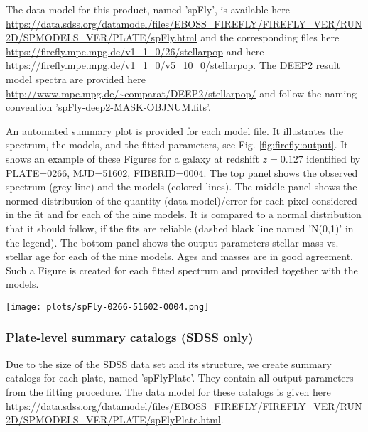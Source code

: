 \documentclass[onecolumn]{aa}
\begin{document}
The data model for this product, named 'spFly', is available here \url{https://data.sdss.org/datamodel/files/EBOSS_FIREFLY/FIREFLY_VER/RUN2D/SPMODELS_VER/PLATE/spFly.html} and the corresponding files here \url{https://firefly.mpe.mpg.de/v1_1_0/26/stellarpop} and here \url{https://firefly.mpe.mpg.de/v1_1_0/v5_10_0/stellarpop}. 
The DEEP2 result model spectra are provided here \url{http://www.mpe.mpg.de/~comparat/DEEP2/stellarpop/} and follow the naming convention 'spFly-deep2-MASK-OBJNUM.fits'.%

An automated summary plot is provided for each model file. 
It illustrates the spectrum, the models, and the fitted parameters, see Fig. \ref{fig:firefly:output}. 
It shows an example of these Figures for a galaxy at redshift $z=0.127$ identified by PLATE=0266, MJD=51602, FIBERID=0004. 
The top panel shows the observed spectrum (grey line) and the models (colored lines). 
The middle panel shows the normed distribution of the quantity (data-model)/error for each pixel considered in the fit and for each of the nine models. 
It is compared to a normal distribution that it should follow, if the fits are reliable (dashed black line named 'N(0,1)' in the legend). 
The bottom panel shows the output parameters stellar mass vs. stellar age for each of the nine models. 
Ages and masses are in good agreement. %
Such a Figure is created for each fitted spectrum and provided together with the models.


\begin{figure*}
\begin{center}
\caption{\label{fig:firefly:output}
Example of a fit taken from the first plate of SDSS considered in this analysis: 0266. 
The top panel shows the observed spectrum (grey line) and its models (colored lines). 
The middle panel shows the $\chi^2$ distribution per pixel for each fit compared to a normal distribution (labeled N(0,1), dashed line). 
The bottom panel shows the output parameters stellar mass (y-axis) vs stellar age (x-axis), which nicely agree. Each blue point refers to one of the nine models. The blue points are related to their respective caption by black arrows. 
This Figure is generated for each fit and is available in the data repository.}
\texttt{[image: plots/spFly-0266-51602-0004.png]}
\end{center}
\end{figure*}


\subsubsection{Plate-level summary catalogs (SDSS only)}
Due to the size of the SDSS data set and its structure, we create summary catalogs for each plate, named 'spFlyPlate'.
They contain all output parameters from the fitting procedure. 
The data model for these catalogs is given here 
\url{https://data.sdss.org/datamodel/files/EBOSS_FIREFLY/FIREFLY_VER/RUN2D/SPMODELS_VER/PLATE/spFlyPlate.html}. %
\end{document}
